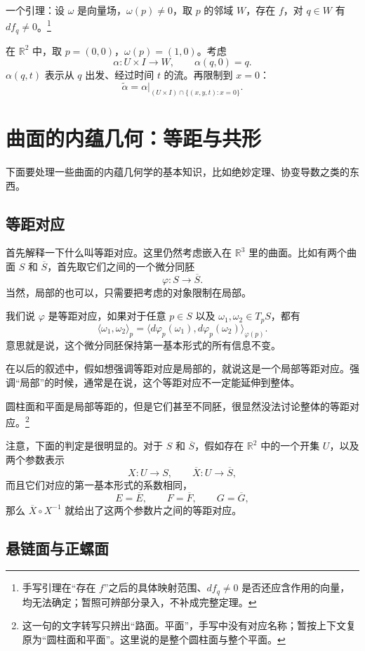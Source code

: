 \documentclass[UTF8,11pt,a4paper]{ctexart}
\newcommand{\ip}[2]{\langle #1,#2\rangle}
\begin{document}
一个引理：设 $\omega$ 是向量场，$\omega(p)\ne0$，取 $p$ 的邻域 $W$，存在 $f$，对 $q\in W$ 有 $df_q\ne0$。\footnote{手写引理在“存在 $f$”之后的具体映射范围、$df_q\ne0$ 是否还应含作用的向量，均无法确定；暂照可辨部分录入，不补成完整定理。}

在 $\mathbb R^2$ 中，取 $p=(0,0)$，$\omega(p)=(1,0)$。考虑
\[
\alpha\colon U\times I\longrightarrow W,\qquad
\alpha(q,0)=q.
\]
$\alpha(q,t)$ 表示从 $q$ 出发、经过时间 $t$ 的流。再限制到 $x=0$：
\[
\widetilde\alpha
=\alpha\big|_{(U\times I)\cap\{(x,y,t):x=0\}}.
\]

\section{曲面的内蕴几何：等距与共形}

下面要处理一些曲面的内蕴几何学的基本知识，比如绝妙定理、协变导数之类的东西。

\subsection{等距对应}

首先解释一下什么叫等距对应。这里仍然考虑嵌入在 $\mathbb R^3$ 里的曲面。比如有两个曲面 $S$ 和 $\overline S$，首先取它们之间的一个微分同胚
\[
\varphi\colon S\longrightarrow\overline S.
\]
当然，局部的也可以，只需要把考虑的对象限制在局部。

我们说 $\varphi$ 是等距对应，如果对于任意 $p\in S$ 以及 $\omega_1,\omega_2\in T_pS$，都有
\[
\ip{\omega_1}{\omega_2}_p
=\ip{d\varphi_p(\omega_1)}{d\varphi_p(\omega_2)}_{\varphi(p)}.
\]
意思就是说，这个微分同胚保持第一基本形式的所有信息不变。

在以后的叙述中，假如想强调等距对应是局部的，就说这是一个局部等距对应。强调“局部”的时候，通常是在说，这个等距对应不一定能延伸到整体。

圆柱面和平面是局部等距的，但是它们甚至不同胚，很显然没法讨论整体的等距对应。\footnote{这一句的文字转写只辨出“路面。平面”，手写中没有对应名称；暂按上下文复原为“圆柱面和平面”。这里说的是整个圆柱面与整个平面。}

注意，下面的判定是很明显的。对于 $S$ 和 $\overline S$，假如存在 $\mathbb R^2$ 中的一个开集 $U$，以及两个参数表示
\[
X\colon U\longrightarrow S,\qquad
\overline X\colon U\longrightarrow\overline S,
\]
而且它们对应的第一基本形式的系数相同，
\[
E=\overline E,\qquad F=\overline F,\qquad G=\overline G,
\]
那么 $\overline X\circ X^{-1}$ 就给出了这两个参数片之间的等距对应。

\subsection{悬链面与正螺面}
\end{document}
